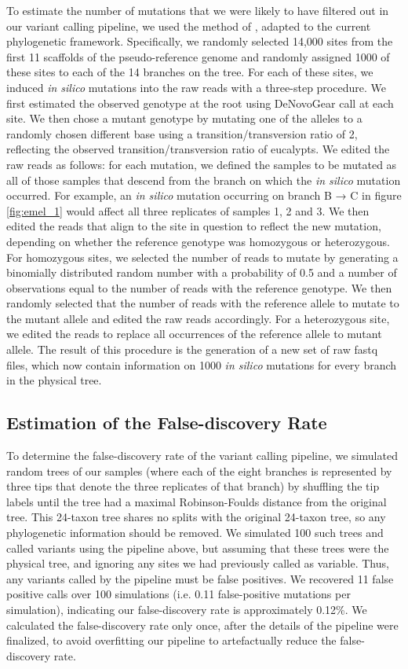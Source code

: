 To estimate the number of mutations that we were likely to have filtered out in our variant calling pipeline, we used the method of \cite{ness_estimate_2012}, adapted to the current phylogenetic framework. Specifically, we randomly selected 14,000 sites from the first 11 scaffolds of the pseudo-reference genome and randomly assigned 1000 of these sites to each of the 14 branches on the tree. For each of these sites, we induced \textit{in silico} mutations into the raw reads with a three-step procedure. We first estimated the observed genotype at the root using DeNovoGear call at each site. We then chose a mutant genotype by mutating one of the alleles to a randomly chosen different base using a transition/transversion ratio of 2, reflecting the observed transition/transversion ratio of eucalypts. We edited the raw reads as follows: for each mutation, we defined the samples to be mutated as all of those samples that descend from the branch on which the \textit{in silico} mutation occurred. For example, an \textit{in silico} mutation occurring on branch B → C in figure \ref{fig:emel_1} would affect all three replicates of samples 1, 2 and 3. We then edited the reads that align to the site in question to reflect the new mutation, depending on whether the reference genotype was homozygous or heterozygous. For homozygous sites, we selected the number of reads to mutate by generating a binomially distributed random number with a probability of 0.5 and a number of observations equal to the number of reads with the reference genotype. We then randomly selected that the number of reads with the reference allele to mutate to the mutant allele and edited the raw reads accordingly. For a heterozygous site, we edited the reads to replace all occurrences of the reference allele to mutant allele. The result of this procedure is the generation of a new set of raw fastq files, which now contain information on 1000 \textit{in silico} mutations for every branch in the physical tree.

\subsection{Estimation of the False-discovery Rate}

To determine the false-discovery rate of the variant calling pipeline, we simulated random trees of our samples (where each of the eight branches is represented by three tips that denote the three replicates of that branch) by shuffling the tip labels until the tree had a maximal Robinson-Foulds distance from the original tree. This 24-taxon tree shares no splits with the original 24-taxon tree, so any phylogenetic information should be removed. We simulated 100 such trees and called variants using the pipeline above, but assuming that these trees were the physical tree, and ignoring any sites we had previously called as variable. Thus, any variants called by the pipeline must be false positives. We recovered 11 false positive calls over 100 simulations (i.e. 0.11 false-positive mutations per simulation), indicating our false-discovery rate is approximately 0.12\%. We calculated the false-discovery rate only once, after the details of the pipeline were finalized, to avoid overfitting our pipeline to artefactually reduce the false-discovery rate.

